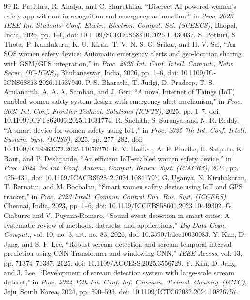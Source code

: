 \documentclass[conference]{IEEEtran}
\begin{document}
\balance
\begin{thebibliography}{99}
 R. Pavithra, R. Ahalya, and C. Shuruthika, ``Discreet AI-powered women's safety app with audio recognition and emergency automation,'' in \emph{Proc. 2026 IEEE Int. Students' Conf. Electr., Electron. Comput. Sci. (SCEECS)}, Bhopal, India, 2026, pp. 1--6, doi: 10.1109/SCEECS68810.2026.11430037.
 S. Potturi, S. Thota, P. Kandukuru, K. U. Kiran, T. V. N. S. G. Srikar, and H. V. Sai, ``An SOS women safety device: Automatic emergency alerts and geo-location sharing with GSM/GPS integration,'' in \emph{Proc. 2026 Int. Conf. Intell. Comput., Netw. Secur. (IC-ICNS)}, Bhubaneswar, India, 2026, pp. 1--6, doi: 10.1109/IC-ICNS68863.2026.11537940.
 P. S. Bharathi, T. Judgi, D. Pradeep, T. S. Arulananth, A. A. A. Samhan, and J. Giri, ``A novel Internet of Things (IoT) enabled women safety system design with emergency alert mechanism,'' in \emph{Proc. 2025 Int. Conf. Frontier Technol. Solutions (ICFTS)}, 2025, pp. 1--7, doi: 10.1109/ICFTS62006.2025.11031774.
 R. Snehith, S. Saranya, and N. R. Reddy, ``A smart device for women safety using IoT,'' in \emph{Proc. 2025 7th Int. Conf. Intell. Sustain. Syst. (ICISS)}, 2025, pp. 277--282, doi: 10.1109/ICISS63372.2025.11076270.
 R. V. Hadkar, A. P. Phadke, H. Satpute, K. Raut, and P. Deshpande, ``An efficient IoT-enabled women safety device,'' in \emph{Proc. 2024 3rd Int. Conf. Autom., Comput. Renew. Syst. (ICACRS)}, 2024, pp. 425--431, doi: 10.1109/ICACRS62842.2024.10841797.
 G. Uganya, N. Kirubakaran, T. Bernatin, and M. Boobalan, ``Smart women safety device using IoT and GPS tracker,'' in \emph{Proc. 2023 Intell. Comput. Control Eng. Bus. Syst. (ICCEBS)}, Chennai, India, 2023, pp. 1--6, doi: 10.1109/ICCEBS58601.2023.10449302.
 G. Ciaburro and V. Puyana-Romero, ``Sound event detection in smart cities: A systematic review of methods, datasets, and applications,'' \emph{Big Data Cogn. Comput.}, vol. 10, no. 3, art. no. 83, 2026, doi: 10.3390/bdcc10030083.
 Y. Kim, D. Jang, and S.-P. Lee, ``Robust scream detection and scream temporal interval prediction using CNN-Transformer and windowing CNN,'' \emph{IEEE Access}, vol. 13, pp. 71374--71387, 2025, doi: 10.1109/ACCESS.2025.3556729.
 Y. Kim, D. Jang, and J. Lee, ``Development of scream detection system with large-scale scream dataset,'' in \emph{Proc. 2024 15th Int. Conf. Inf. Commun. Technol. Converg. (ICTC)}, Jeju, South Korea, 2024, pp. 590--593, doi: 10.1109/ICTC62082.2024.10826757.

\end{thebibliography}
\end{document}
